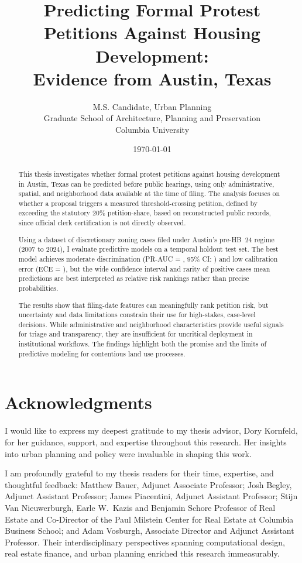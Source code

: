 \documentclass[11pt, letterpaper]{article}
\title{Predicting Formal Protest Petitions Against Housing Development:\\
Evidence from Austin, Texas}
\author{M.S. Candidate, Urban Planning\\
Graduate School of Architecture, Planning and Preservation\\
Columbia University}
\date{\today}
\begin{document}
\sloppy
\maketitle

\begin{abstract}
This thesis investigates whether formal protest petitions against housing development in Austin, Texas can be predicted before public hearings, using only administrative, spatial, and neighborhood data available at the time of filing. The analysis focuses on whether a proposal triggers a measured threshold-crossing petition, defined by exceeding the statutory 20\% petition-share, based on reconstructed public records, since official clerk certification is not directly observed.

Using a dataset of discretionary zoning cases filed under Austin's pre-HB~24 regime (2007 to 2024), I evaluate predictive models on a temporal holdout test set. The best model achieves moderate discrimination (PR-AUC = \metricBootstrapFiling{}, 95\% CI: \metricBootstrapFilingCI{}) and low calibration error (ECE = \metricECEOODBootstrapCalibrated{}), but the wide confidence interval and rarity of positive cases mean predictions are best interpreted as relative risk rankings rather than precise probabilities.

The results show that filing-date features can meaningfully rank petition risk, but uncertainty and data limitations constrain their use for high-stakes, case-level decisions. While administrative and neighborhood characteristics provide useful signals for triage and transparency, they are insufficient for uncritical deployment in institutional workflows. The findings highlight both the promise and the limits of predictive modeling for contentious land use processes.
\end{abstract}

\newpage
\section*{Acknowledgments}
I would like to express my deepest gratitude to my thesis advisor, Dory Kornfeld, for her guidance, support, and expertise throughout this research. Her insights into urban planning and policy were invaluable in shaping this work.

I am profoundly grateful to my thesis readers for their time, expertise, and thoughtful feedback: Matthew Bauer, Adjunct Associate Professor; Josh Begley, Adjunct Assistant Professor; James Piacentini, Adjunct Assistant Professor; Stijn Van Nieuwerburgh, Earle W.\ Kazis and Benjamin Schore Professor of Real Estate and Co-Director of the Paul Milstein Center for Real Estate at Columbia Business School; and Adam Vosburgh, Associate Director and Adjunct Assistant Professor. Their interdisciplinary perspectives spanning computational design, real estate finance, and urban planning enriched this research immeasurably.
\end{document}
